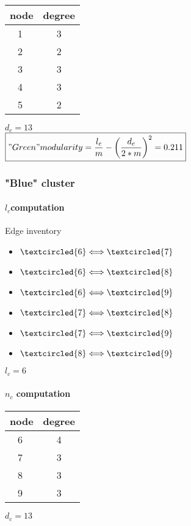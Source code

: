 \documentclass[a4paper]{article}
\begin{document}
\begin{table}[h]
\begin{tabular}{|c|c|}
\hline
node&degree\\
\hline
\textcircled{1}& 3\\
\textcircled{2}& 2\\
\textcircled{3}& 3\\
\textcircled{4}& 3\\
\textcircled{5}& 2\\
\hline
\end{tabular}

\end{table}
$\boxed{d_{c}=13}$
\\

$\boxed{"Green" modularity=\frac{l_{c}}{m} - \left(\frac{d_{c}}{2*m}\right)^{2}=0.211}$

\subsubsection{ "Blue" cluster}

\paragraph{$l_{c}$computation}

Edge inventory
\begin{itemize}
\item $\textcircled{6}\Longleftrightarrow \textcircled{7}$
\item $\textcircled{6}\Longleftrightarrow \textcircled{8}$
\item $\textcircled{6}\Longleftrightarrow \textcircled{9}$
\item $\textcircled{7}\Longleftrightarrow \textcircled{8}$
\item $\textcircled{7}\Longleftrightarrow \textcircled{9}$
\item $\textcircled{8}\Longleftrightarrow \textcircled{9}$
\end{itemize}
$\boxed{l_{c}=6}$
\paragraph{$n_{c}$ computation}

\begin{table}[h]
\begin{tabular}{|c|c|}
\hline
node&degree\\
\hline
\textcircled{6}& 4\\
\textcircled{7}& 3\\
\textcircled{8}& 3\\
\textcircled{9}& 3\\
\hline
\end{tabular}

\end{table}
$\boxed{d_{c}=13}$
\\
\end{document}
